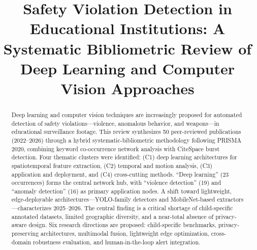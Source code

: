 \documentclass[conference]{IEEEtran}
\begin{document}
\title{Safety Violation Detection in Educational Institutions: A Systematic Bibliometric Review of Deep Learning and Computer Vision Approaches}

\author{
\and
{}
}

\maketitle

\begin{abstract}
Deep learning and computer vision techniques are increasingly proposed for automated detection of safety violations---violence, anomalous behavior, and weapons---in educational surveillance footage. This review synthesizes 50 peer-reviewed publications (2022--2026) through a hybrid systematic-bibliometric methodology following PRISMA 2020, combining keyword co-occurrence network analysis with CiteSpace burst detection. Four thematic clusters were identified: (C1) deep learning architectures for spatiotemporal feature extraction, (C2) temporal and motion analysis, (C3) application and deployment, and (C4) cross-cutting methods. ``Deep learning'' (23 occurrences) forms the central network hub, with ``violence detection'' (19) and ``anomaly detection'' (16) as primary application nodes. A shift toward lightweight, edge-deployable architectures---YOLO-family detectors and MobileNet-based extractors---characterizes 2025--2026. The central finding is a critical shortage of child-specific annotated datasets, limited geographic diversity, and a near-total absence of privacy-aware design. Six research directions are proposed: child-specific benchmarks, privacy-preserving architectures, multimodal fusion, lightweight edge optimization, cross-domain robustness evaluation, and human-in-the-loop alert integration.
\end{abstract}
\end{document}
